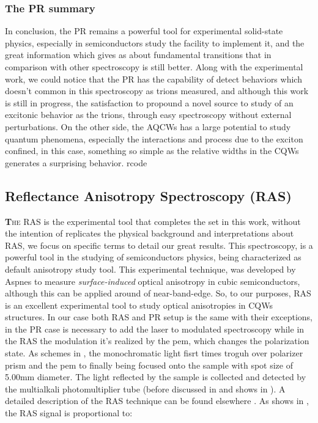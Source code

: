  \subsubsection{The PR summary}
 \label{subsubsec:chapter-3-ps-conclusions}
 \vspace{-10mm}
 In conclusion, the PR remains a powerful tool for experimental solid-state physics, especially in semiconductors study the facility to implement it, and the great information which gives as about fundamental transitions that in comparison with other spectroscopy is still better. Along with the experimental work, we could notice that the PR has the capability of detect behaviors which doesn't common in this spectroscopy as trions measured, and although this work is still in progress, the satisfaction to propound a novel source to study of an excitonic behavior as the trions,  through easy spectroscopy without external perturbations.  On the other side, the AQCWs has a large potential to study quantum phenomena, especially the interactions and process due to the exciton confined, in this case, something so simple as the relative widths in the CQWs generates a surprising behavior. 
rcode 
\subsection{Reflectance Anisotropy Spectroscopy (RAS)}
\label{subsec:chapter-3-ras}
 \vspace{-10mm}
\lettrine[lines=3, lraise=.1, nindent=0mm, slope=0mm]{\textbf{T}}{he \gls{RAS}} is the experimental tool that completes the set in this work, without the intention of replicates the physical background and interpretations about RAS, we focus on specific terms to detail our great results.  This spectroscopy, is a  powerful tool in the studying of semiconductors physics, being characterized as default anisotropy study tool.  This experimental technique, was developed by Aspnes\cite{aspnes1973surface,aspnes1985anisotropies, aspnes1985above} to measure \emph{surface-induced} optical anisotropy in cubic semiconductors, although this can be applied around of near-band-edge\cite{wei1995theory}. So, to our purposes, \gls{RAS} is an excellent experimental tool to study optical anisotropies in CQWs structures. In our case both \gls{RAS} and \gls{PR} setup is the same with their exceptions, in the \gls{PR} case is necessary to add the laser to modulated spectroscopy while in the \gls{RAS} the modulation it's realized by the \gls{pem}, which changes the polarization state. As schemes in , the monochromatic light fisrt times troguh over polarizer prism and the \gls{pem} to finally being focused onto the sample with spot size of 5.00mm diameter. The light reflected by the sample is collected and detected by the multialkali photomultiplier tube (before discussed in  and shows in ). A detailed description of the RAS technique can be found elsewhere \cite{lflm1993spectrometer}. As shows in , the RAS signal is proportional to: 

